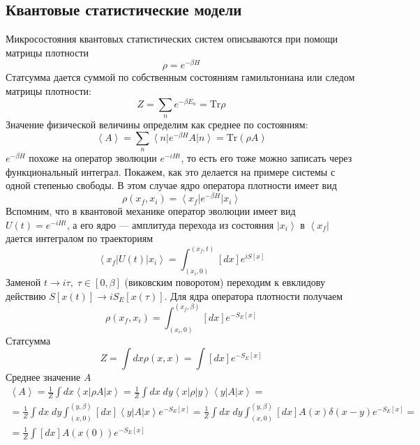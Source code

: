 \documentclass[a4paper,12pt]{article}
\theoremstyle{definition}
\theoremstyle{definition}
\theoremstyle{definition}
\begin{document}
\subsection*{Квантовые статистические модели}
\label{sec:quantum-statistical-models}

Микросостояния квантовых статистических систем описываются при помощи матрицы плотности
\begin{equation}
  \label{eq:19}
  \rho=e^{-\beta H}
\end{equation}
Статсумма дается суммой по собственным состояниям гамильтониана или следом матрицы плотности:
\begin{equation}
  \label{eq:20}
  Z=\sum_n e^{-\beta E_n}=\mathrm{Tr} \rho
\end{equation}
Значение физической величины определим как среднее по состояниям:
\begin{equation}
  \label{eq:21}
  \left< A\right>=\sum_n \left< n\right| e^{-\beta H}A\left| n \right>=\mathrm{Tr}(\rho A)
\end{equation}
$e^{-\beta H}$ похоже на оператор эволюции $e^{-i H t}$, то есть его тоже можно записать через функциональный интеграл. Покажем, как это делается на примере системы с одной степенью свободы. В этом случае ядро оператора плотности имеет вид
\begin{equation}
  \label{eq:22}
  \rho(x_f,x_i)=\left<x_f\right|e^{-\beta H} \left|x_i\right>
\end{equation}
Вспомним, что в квантовой механике оператор эволюции имеет вид $U(t)=e^{-i H t}$, а его ядро --- амплитуда перехода из состояния $\left|x_i\right>$ в $\left<x_f\right|$ дается интегралом по траекториям
\begin{equation}
  \label{eq:23}
  \left<x_f\right| U(t)\left| x_i\right>=\int_{(x_i,0)}^{(x_f,t)} [dx] e^{i S[x]}
\end{equation}
Заменой $t\to i\tau, \; \tau\in [0,\beta]$ (виковским поворотом) переходим к евклидову действию $S[x(t)]\to iS_E[x(\tau)]$. Для ядра оператора плотности получаем
\begin{equation}
  \label{eq:24}
  \rho(x_f,x_i)=\int_{(x_i,0)}^{(x_f,\beta)} [dx] e^{-S_E[x]}
\end{equation}
Статсумма
\begin{equation}
  \label{eq:25}
  Z=\int dx \rho(x,x)=\int [dx] e^{-S_E[x]}
\end{equation}
Среднее значение $A$
\begin{equation}
  \label{eq:26}
  \begin{array}{l}
    \left<A\right>=\frac{1}{Z}\int dx \left<x\right|\rho A\left|x\right>=\frac{1}{Z}\int dx\; dy \left<x\right|\rho\left|y\right>\left<y\right|A\left|x\right>=    \\
    =\frac{1}{Z}\int dx\; dy \int_{(x,0)}^{(y,\beta)} [dx] \left<y\right| A\left| x\right> e^{-S_E[x]}=\frac{1}{Z}\int dx\; dy\int_{(x,0)}^{(y,\beta)} [dx] A(x) \delta(x-y) e^{-S_E[x]}=\\
    =\frac{1}{Z}\int [dx] A(x(0))e^{-S_E[x]}
  \end{array}
\end{equation}
\end{document}
